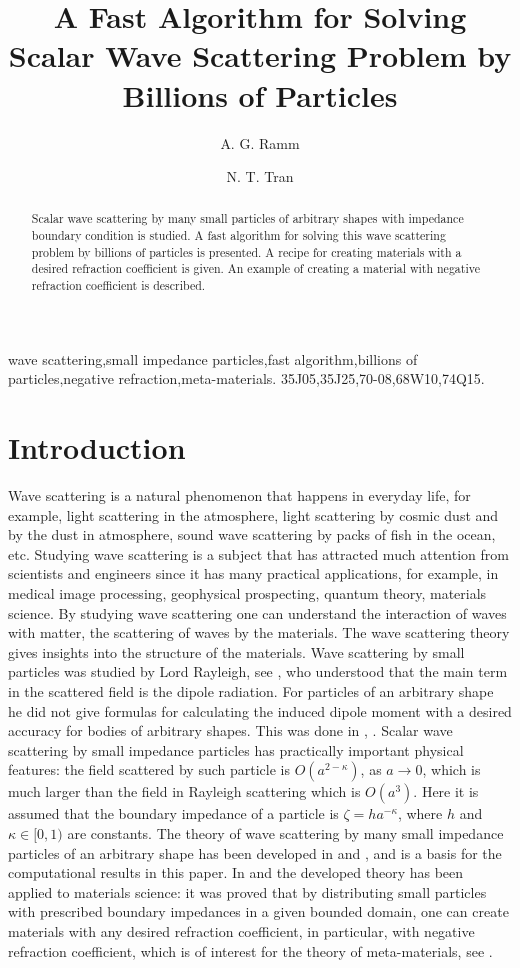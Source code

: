 \documentclass[12pt]{elsarticle}
\title{A Fast Algorithm for Solving Scalar Wave Scattering Problem by Billions of Particles}
\author[ar]{A. G. Ramm}
\author[nt]{N. T. Tran\corref{cor1}}
\date{}
\numberwithin{equation}{section}
\begin{document}
\begin{keyword}
wave scattering\sep small impedance particles\sep fast algorithm\sep billions of particles\sep negative refraction\sep meta-materials.
\MSC 35J05\sep 35J25\sep 70-08\sep 68W10\sep 74Q15.
\end{keyword}

\begin{abstract}
Scalar wave scattering by many small particles of arbitrary shapes
with impedance boundary condition is studied. A fast algorithm for solving this
wave scattering problem by billions of particles is presented. A recipe for
creating materials with a desired refraction coefficient is given. An example
of creating a material with negative refraction coefficient is described.
\end{abstract}

\maketitle

\section{Introduction} \label{sec1}
Wave scattering is a natural phenomenon that happens in everyday life, for example, light scattering in the atmosphere, light scattering by cosmic dust and by the dust in atmosphere, sound wave scattering by packs of fish in the ocean, etc.
Studying wave scattering is a subject that has attracted much attention from scientists and engineers since it has many practical applications, for example, in  medical image processing,  geophysical prospecting, quantum theory, materials science. By studying wave scattering one can understand the interaction of waves with matter,  the scattering of waves by the materials.
The wave scattering theory gives insights into the structure of the materials. Wave scattering by small particles was studied by Lord Rayleigh, see \cite{Ray}, who understood that the main term in the scattered field is the dipole radiation. For particles of an arbitrary shape he did not give formulas for calculating the induced dipole moment with a desired accuracy for bodies of arbitrary shapes. This was done in \cite{R57}, \cite{R476}. Scalar wave scattering by small impedance particles has practically important physical features:
the field scattered by such particle is $O(a^{2-\kappa})$, as $a\to 0$, which is  much larger than the field in Rayleigh scattering which is $O(a^3)$. Here it is assumed that the boundary impedance of a particle is $\zeta=ha^{-\kappa}$, where $h$ and $\kappa\in [0,1)$ are constants. The theory of wave scattering by many small impedance particles of an arbitrary shape has been developed in \cite{R632} and \cite{R635}, and is a basis for the computational results in this paper. In \cite{R632} and \cite{R635} the developed theory has been applied to materials science: it
was proved that by distributing  small particles with  prescribed boundary impedances in a given bounded domain, one can create materials with any desired refraction coefficient, in particular, with negative refraction coefficient, which is of interest for the theory of meta-materials, see \cite{EB2005}.
\end{document}
